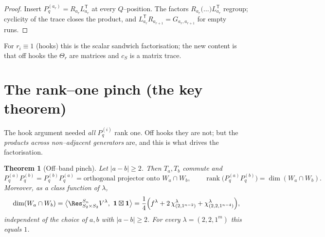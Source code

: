 \documentclass[11pt]{article}
\newtheorem{theorem}{Theorem}
\theoremstyle{definition}
\DeclareMathOperator{\rank}{rank}
\newcommand{\Pq}{P_{q}}
\newcommand{\la}{\lambda}
\newcommand{\W}{W}
\begin{document}
\begin{proof}
Insert $\Pq^{(a_r)}=R_{a_r}L_{a_r}^{\mathsf T}$ at every $Q$--position. The factors
$R_{a_r}\bigl(\dots\bigr)L_{a_r}^{\mathsf T}$ regroup; cyclicity of the trace closes the
product, and $L_{a_r}^{\mathsf T}R_{a_{r+1}}=G_{a_r,a_{r+1}}$ for empty runs.
\end{proof}

For $r_i\equiv1$ (hooks) this is the scalar sandwich factorisation; the new content is
that off hooks the $\Theta_r$ are matrices and $c_S$ is a matrix trace.

\section{The rank--one pinch (the key theorem)}

The hook argument needed \emph{all} $\Pq^{(i)}$ rank one. Off hooks they are not; but the
\emph{products across non--adjacent generators} are, and this is what drives the
factorisation.

\begin{theorem}[Off--band pinch]\label{thm:pinch}
Let $|a-b|\ge2$. Then $T_a,T_b$ commute and
\[
\Pq^{(a)}\Pq^{(b)}=\Pq^{(b)}\Pq^{(a)}=\text{orthogonal projector onto }\W_a\cap\W_b,
\qquad
\rank\bigl(\Pq^{(a)}\Pq^{(b)}\bigr)=\dim(\W_a\cap\W_b).
\]
Moreover, as a class function of $\la$,
\[
\dim(\W_a\cap\W_b)=\bigl\langle\Res^{S_n}_{S_2\times S_2}V^\la,\ \mathbf 1\boxtimes\mathbf 1\bigr\rangle
=\frac14\Bigl(f^\la+2\,\chi^\la_{(2,1^{n-2})}+\chi^\la_{(2,2,1^{n-4})}\Bigr),
\]
independent of the choice of $a,b$ with $|a-b|\ge2$. For every $\la=(2,2,1^m)$ this
equals $1$.
\end{theorem}
\end{document}
